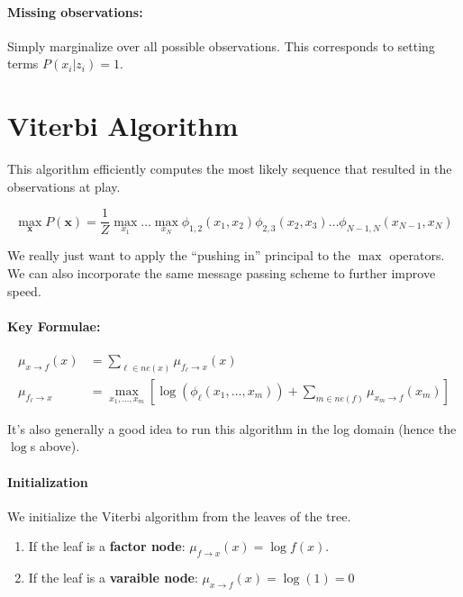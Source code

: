 \documentclass[a4paper,12pt]{report}
\begin{document}
\paragraph{Missing observations: } Simply marginalize over all possible observations. This corresponds to setting terms $P(x_i | z_i) = 1$.



\section{Viterbi Algorithm}

This algorithm efficiently computes the most likely sequence that resulted in the observations at play. 

\begin{equation}
\max_{\pmb x} P(\pmb x) = \frac{1}{Z} \max_{x_1}\dots\max_{x_N} \phi_{1,2}(x_1,x_2) \phi_{2,3}(x_2, x_3) \dots \phi_{N-1,N}(x_{N-1}, x_N)
\end{equation}

We really just want to apply the ``pushing in'' principal to the $\max$ operators. We can also incorporate the same message passing scheme to further improve speed. 

\paragraph{Key Formulae: } 
\begin{equation}
\begin{split}
\mu_{x\to f}(x) &= \sum_{\ell \in ne(x)}^{} \mu_{f_\ell \to x}(x) \\
\mu_{f_\ell \to x} &= \max_{x_1, \dots, x_m} [\log(\phi_\ell(x_1, \dots, x_m)) + \sum_{m\in ne(f)}^{} \mu_{x_m \to f}(x_m) ]
\end{split}
\end{equation}


It's also generally a good idea to run this algorithm in the log domain (hence the $\log$s above).

\paragraph{Initialization} 

We initialize the Viterbi algorithm from the leaves of the tree. 
\begin{enumerate}
\item If the leaf is a \textbf{factor node}: $\mu_{f\to x}(x) = \log f(x)$.
\item If the leaf is a \textbf{varaible node}: $\mu_{x\to f}(x) = \log(1) = 0$
\end{enumerate}
\end{document}
